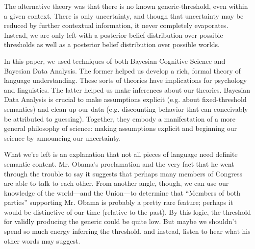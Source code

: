 \documentclass[10pt,letterpaper]{article}
\begin{document}
The alternative theory was that there is no known generic-threshold, even within a given context. There is only uncertainty, and though that uncertainty may be reduced by further contextual information, it never completely evaporates. Instead, we are only left with a posterior belief distribution over possible thresholds as well as a posterior belief distribution over possible worlds. 

In this paper, we used techniques of both Bayesian Cognitive Science and Bayesian Data Analysis. The former helped us develop a rich, formal theory of language understanding. These sorts of theories have implications for psychology and linguistics. The latter helped us make inferences about our theories. Bayesian Data Analysis is crucial to make assumptions explicit (e.g. about fixed-threshold semantics) and clean up our data (e.g. discounting behavior that can conceivably be attributed to guessing). Together, they embody a manifestation of a more general philosophy of science: making assumptions explicit and beginning our science by announcing our uncertainty.

What we're left is an explanation that not all pieces of language need definite semantic content. Mr. Obama's proclamation and the very fact that he went through the trouble to say it suggests that perhaps many members of Congress are able to talk to each other. From another angle, though, 
we can use our knowledge of the world---and the Union---to determine that ``Members of both parties'' supporting Mr. Obama is probably a pretty rare feature; perhaps it would be distinctive of our time (relative to the past). By this logic, the threshold for validly producing the generic could be quite low.  But maybe we shouldn't spend so much energy inferring the threshold, and instead, listen to hear what his other words may suggest.

%
%
%
%
%
%
%
\end{document}
